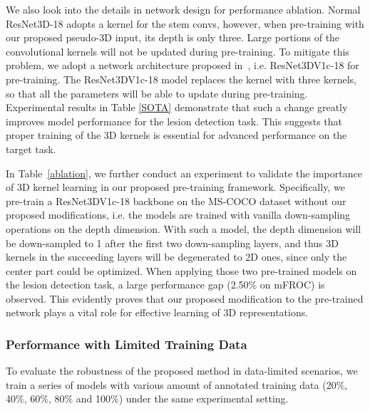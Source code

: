 \documentclass[journal,twoside,web]{ieeecolor}
\begin{document}
We also look into the details in network design for performance ablation. Normal ResNet3D-18 adopts a  kernel for the stem convs, however, when pre-training with our proposed pseudo-3D input, its depth is only three. Large portions of the convolutional kernels will not be updated during pre-training. To mitigate this problem, we adopt a network architecture proposed in~\cite{he2019bag}, i.e. ResNet3DV1c-18 for pre-training. The ResNet3DV1c-18 model replaces the  kernel with three  kernels, so that all the parameters will be able to update during pre-training. Experimental results in Table \ref{SOTA} demonstrate that such a change greatly improves model performance for the lesion detection task. This suggests that proper training of the 3D kernels is essential for advanced performance on the target task.



In Table~\ref{ablation}, we further conduct an experiment to validate the importance of 3D kernel learning in our proposed pre-training framework. Specifically, we pre-train a ResNet3DV1c-18 backbone on the MS-COCO dataset without our proposed modifications, i.e. the models are trained with vanilla down-sampling operations on the depth dimension. With such a model, the depth dimension will be down-sampled to 1 after the first two down-sampling layers, and thus 3D kernels in the succeeding layers will be degenerated to 2D ones, since only the center  part could be optimized. When applying those two pre-trained models on the lesion detection task, a large performance gap (2.50\% on mFROC) is observed. This evidently proves that our proposed modification to the pre-trained network plays a vital role for effective learning of 3D representations.





\subsubsection{Performance with Limited Training Data}

To evaluate the robustness of the proposed method in data-limited scenarios, we train a series of models with various amount of annotated training data (20\%, 40\%, 60\%, 80\% and 100\%) under the same experimental setting. 
\end{document}
